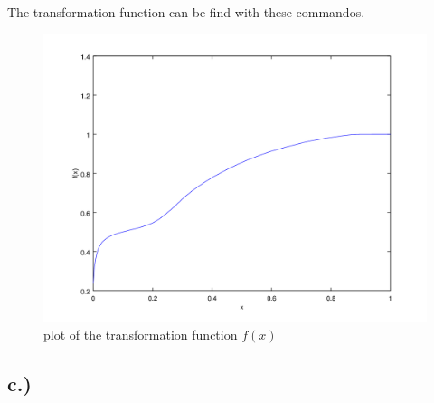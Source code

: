 \documentclass{scrartcl}
\begin{document}
The transformation function can be find with these commandos.

%

\begin{figure}[htp!]
\begin{center}
	\includegraphics[scale=0.45]{histoeq_plot.png}
	\caption{plot of the transformation function $ f(x) $}
\end{center}
\end{figure}

\subsection*{c.)}

%
\end{document}
